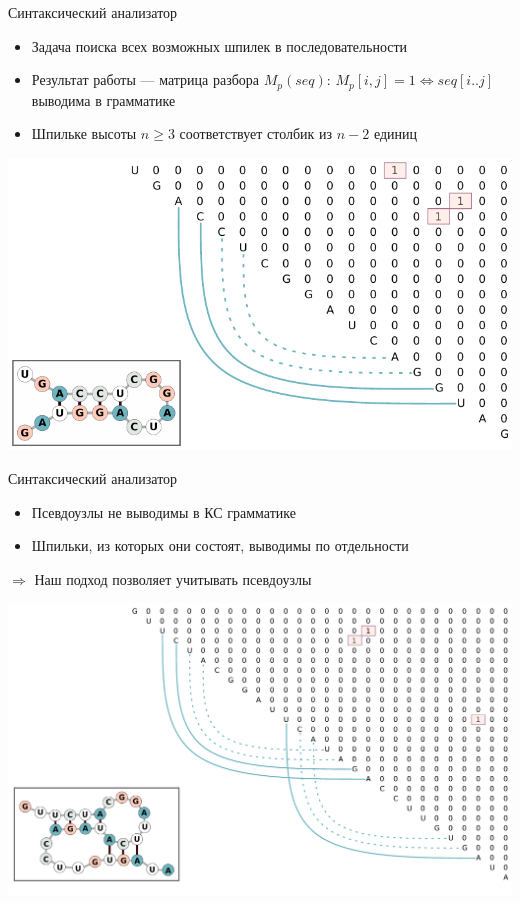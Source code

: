 \documentclass{beamer}
\begin{document}
\begin{frame}{Синтаксический анализатор}
\begin{itemize}
    \item Задача поиска всех возможных шпилек в последовательности
    \item Результат работы --- матрица разбора \linebreak $M_p(seq)$: $M_p[i,j]=1 \iff seq[i..j]$ выводима в грамматике
    \item Шпильке высоты $n \geq 3$ соответствует столбик из $n - 2$ единиц
\end{itemize}

\vspace{3mm}

\centering
\includegraphics[width=.79\textwidth]{pics/matrix.pdf}
\end{frame}

\begin{frame}{Синтаксический анализатор}
\begin{itemize}
    \item Псевдоузлы не выводимы в КС грамматике
    \item Шпильки, из которых они состоят, выводимы по отдельности
\end{itemize}
\hspace{0.15cm} $\Rightarrow$ Наш подход позволяет учитывать псевдоузлы

\vspace{3mm}

\centering
\includegraphics[width=.85\textwidth]{pics/matrix2.pdf}
\end{frame}
\end{document}
